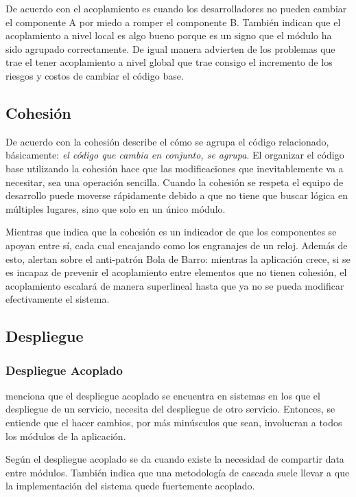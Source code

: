 De acuerdo con \cite{percival2020architecture} el acoplamiento es cuando los desarrolladores no
pueden cambiar el componente A por miedo a romper el componente B. También indican que el
acoplamiento a nivel local es algo bueno porque es un signo que el módulo ha sido agrupado correctamente.
De igual manera advierten de los problemas que trae el tener acoplamiento a nivel global que trae
consigo el incremento de los riesgos y costos de cambiar el código base.


\subsection{Cohesión}

De acuerdo con \cite{newman2019monolith} la cohesión describe el cómo se agrupa el código relacionado,
básicamente: {\it el código que cambia en conjunto, se agrupa}.
El organizar el código base utilizando la cohesión hace que las modificaciones que inevitablemente
va a necesitar, sea una operación sencilla.
Cuando la cohesión se respeta el equipo de desarrollo puede moverse rápidamente debido a que no tiene
que buscar lógica en múltiples lugares, sino que solo en un único módulo.

Mientras que \cite{percival2020architecture} indica que la cohesión es un indicador de que los componentes
se apoyan entre sí, cada cual encajando como los engranajes de un reloj.
Además de esto, alertan sobre el anti-patrón Bola de Barro: mientras la aplicación crece, si se es incapaz de
prevenir el acoplamiento entre elementos que no tienen cohesión, el acoplamiento escalará de manera superlineal
hasta que ya no se pueda modificar efectivamente el sistema.


\subsection{Despliegue}


\subsubsection{Despliegue Acoplado}

\cite{newman2019monolith} menciona que el despliegue acoplado se encuentra en sistemas en los que el
despliegue de un servicio, necesita del despliegue de otro servicio.
Entonces, se entiende que el hacer cambios, por más minúsculos que sean, involucran a todos los módulos
de la aplicación.

Según \cite{nadareishvili2016microservice} el despliegue acoplado se da cuando existe la necesidad
de compartir data entre módulos.
También indica que una metodología de cascada suele llevar a que la implementación del sistema
quede fuertemente acoplado.


